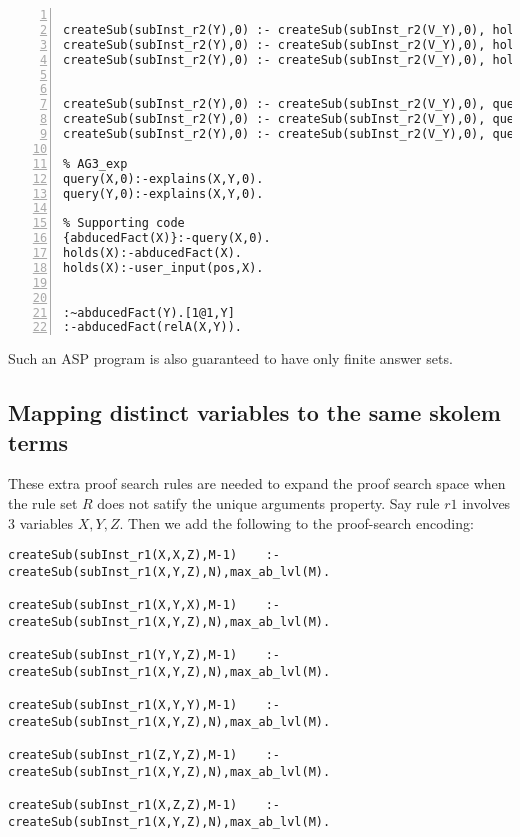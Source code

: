 \begin{lstlisting}[numbers=left]
% AG2_exp for rule 2

createSub(subInst_r2(Y),0) :- createSub(subInst_r2(V_Y),0), holds(relE(Y)).
createSub(subInst_r2(Y),0) :- createSub(subInst_r2(V_Y),0), holds(relD(Y)).
createSub(subInst_r2(Y),0) :- createSub(subInst_r2(V_Y),0), holds(relF(Y)).


createSub(subInst_r2(Y),0) :- createSub(subInst_r2(V_Y),0), query(relE(Y),0).
createSub(subInst_r2(Y),0) :- createSub(subInst_r2(V_Y),0), query(relD(Y),0).
createSub(subInst_r2(Y),0) :- createSub(subInst_r2(V_Y),0), query(relF(Y),0).

% AG3_exp
query(X,0):-explains(X,Y,0).
query(Y,0):-explains(X,Y,0).

% Supporting code
{abducedFact(X)}:-query(X,0).
holds(X):-abducedFact(X).
holds(X):-user_input(pos,X).


:~abducedFact(Y).[1@1,Y]
:-abducedFact(relA(X,Y)).
\end{lstlisting}
Such an ASP program is also guaranteed to have only finite answer sets.

\subsection{Mapping distinct variables to the same skolem terms}
These extra proof search rules are needed to expand the proof search space when the rule set $R$ does not satify the unique arguments property. Say rule $r1$ involves 3 variables $X, Y, Z$. Then we add the following to the proof-search encoding:
\begin{verbatim}
createSub(subInst_r1(X,X,Z),M-1)    :-createSub(subInst_r1(X,Y,Z),N),max_ab_lvl(M).

createSub(subInst_r1(X,Y,X),M-1)    :-createSub(subInst_r1(X,Y,Z),N),max_ab_lvl(M).

createSub(subInst_r1(Y,Y,Z),M-1)    :-createSub(subInst_r1(X,Y,Z),N),max_ab_lvl(M).

createSub(subInst_r1(X,Y,Y),M-1)    :-createSub(subInst_r1(X,Y,Z),N),max_ab_lvl(M).

createSub(subInst_r1(Z,Y,Z),M-1)    :-createSub(subInst_r1(X,Y,Z),N),max_ab_lvl(M).

createSub(subInst_r1(X,Z,Z),M-1)    :-createSub(subInst_r1(X,Y,Z),N),max_ab_lvl(M).
\end{verbatim}

